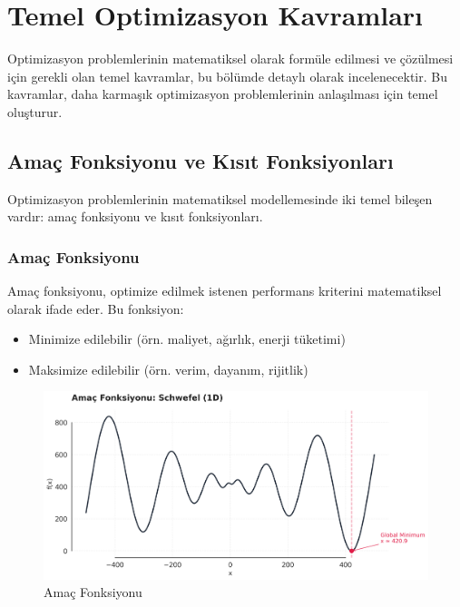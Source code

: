 \section{Temel Optimizasyon Kavramları}
Optimizasyon problemlerinin matematiksel olarak formüle edilmesi ve çözülmesi için gerekli olan temel kavramlar, bu bölümde detaylı olarak incelenecektir. Bu kavramlar, daha karmaşık optimizasyon problemlerinin anlaşılması için temel oluşturur.

\subsection{Amaç Fonksiyonu ve Kısıt Fonksiyonları}

Optimizasyon problemlerinin matematiksel modellemesinde iki temel bileşen vardır: amaç fonksiyonu ve kısıt fonksiyonları.

\subsubsection{Amaç Fonksiyonu}
Amaç fonksiyonu, optimize edilmek istenen performans kriterini matematiksel olarak ifade eder. Bu fonksiyon:
\begin{itemize}
    \item Minimize edilebilir (örn. maliyet, ağırlık, enerji tüketimi)
    \item Maksimize edilebilir (örn. verim, dayanım, rijitlik)
\end{itemize}

\begin{figure}[H]
    \centering
    \includegraphics[width=1\textwidth]{weeks_new/imgs/objective_function.png}
    \caption{Amaç Fonksiyonu}
    \label{fig:multi_mod}
\end{figure}


